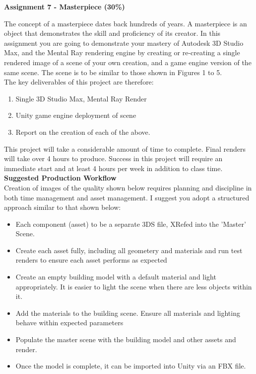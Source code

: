 
	
\begin{flushleft}
\Large\textbf{Assignment 7 - Masterpiece (30\%)}\\
\end{flushleft}

The concept of a masterpiece dates back hundreds of years.  A masterpiece is an object that demonstrates the skill and proficiency of its creator.  In this assignment you are going to demonstrate your mastery of Autodesk 3D Studio Max, and the Mental Ray rendering engine by creating or re-creating a single rendered image of a scene of your own creation, and a game engine version of the same scene. The scene is to be similar to those shown in Figures 1 to 5.\\

The key deliverables of this project are therefore:

\begin{enumerate}
	\item Single 3D Studio Max, Mental Ray Render
	\item Unity game engine deployment of scene
	\item Report on the creation of each of the above.
\end{enumerate}

This project will take a considerable amount of time to complete.  Final renders will take over 4 hours to produce.  Success in this project will require an immediate start and at least 4 hours per week in addition to class time.  \\

\textbf{Suggested Production Workflow}\\
Creation of images of the quality shown below requires planning and discipline in both time management and asset management.  I suggest you adopt a structured approach similar to that shown below:

\begin{itemize}
	\item Each component (asset) to be a separate 3DS file, XRefed into the 'Master' Scene.
	\item Create each asset fully, including all geometery and materials and run test renders to ensure each asset performs as expected
	\item Create an empty building model with a default material and light appropriately.  It is easier to light the scene when there are less objects within it.  
	\item Add the materials to the building scene.  Ensure all materials and lighting behave within expected parameters
	\item Populate the master scene with the building model and other assets and render.
	\item Once the model is complete, it can be imported into Unity via an FBX file.
\end{itemize}

